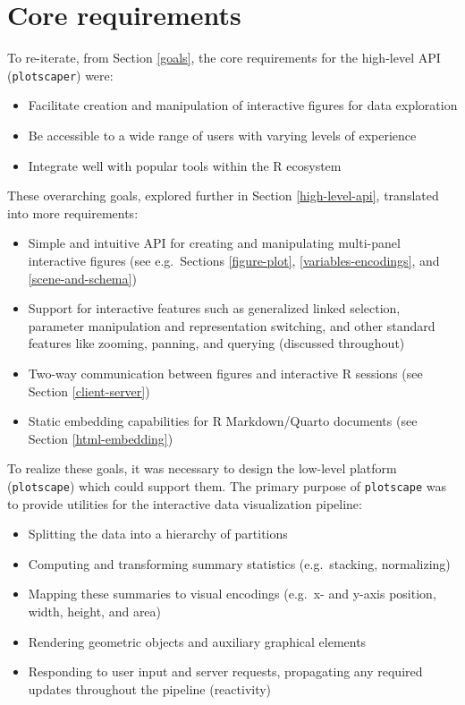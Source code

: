 \documentclass[
  openany]{book}
\providecommand{\tightlist}{%
  \setlength{\itemsep}{0pt}\setlength{\parskip}{0pt}}
\theoremstyle{definition}
\theoremstyle{definition}
\theoremstyle{definition}
\theoremstyle{definition}
\theoremstyle{remark}
\begin{document}
\section{Core requirements}\label{core-requirements}

To re-iterate, from Section \ref{goals}, the core requirements for the high-level API (\texttt{plotscaper}) were:

\begin{itemize}
\tightlist
\item
  Facilitate creation and manipulation of interactive figures for data exploration
\item
  Be accessible to a wide range of users with varying levels of experience
\item
  Integrate well with popular tools within the R ecosystem
\end{itemize}

These overarching goals, explored further in Section \ref{high-level-api}, translated into more requirements:

\begin{itemize}
\tightlist
\item
  Simple and intuitive API for creating and manipulating multi-panel interactive figures (see e.g.~Sections \ref{figure-plot}, \ref{variables-encodings}, and \ref{scene-and-schema})
\item
  Support for interactive features such as generalized linked selection, parameter manipulation and representation switching, and other standard features like zooming, panning, and querying (discussed throughout)
\item
  Two-way communication between figures and interactive R sessions (see Section \ref{client-server})
\item
  Static embedding capabilities for R Markdown/Quarto documents (see Section \ref{html-embedding})
\end{itemize}

To realize these goals, it was necessary to design the low-level platform (\texttt{plotscape}) which could support them. The primary purpose of \texttt{plotscape} was to provide utilities for the interactive data visualization pipeline:

\begin{itemize}
\tightlist
\item
  Splitting the data into a hierarchy of partitions
\item
  Computing and transforming summary statistics (e.g.~stacking, normalizing)
\item
  Mapping these summaries to visual encodings (e.g.~x- and y-axis position, width, height, and area)
\item
  Rendering geometric objects and auxiliary graphical elements
\item
  Responding to user input and server requests, propagating any required updates throughout the pipeline (reactivity)
\end{itemize}
\end{document}
